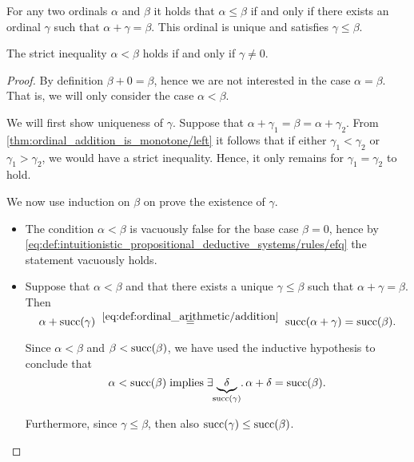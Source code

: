 \begin{proposition}\label{thm:ordinal_ordering_via_addition}
  For any two ordinals \( \alpha \) and \( \beta \) it holds that \( \alpha \leq \beta \) if and only if there exists an ordinal \( \gamma \) such that \( \alpha + \gamma = \beta \). This ordinal is unique and satisfies \( \gamma \leq \beta \).

  The strict inequality \( \alpha < \beta \) holds if and only if \( \gamma \neq 0 \).
\end{proposition}
\begin{proof}
  \SufficiencySubProof By definition \( \beta + 0 = \beta \), hence we are not interested in the case \( \alpha = \beta \). That is, we will only consider the case \( \alpha < \beta \).

  We will first show uniqueness of \( \gamma \). Suppose that \( \alpha + \gamma_1 = \beta = \alpha + \gamma_2 \). From \eqref{thm:ordinal_addition_is_monotone/left} it follows that if either \( \gamma_1 < \gamma_2 \) or \( \gamma_1 > \gamma_2 \), we would have a strict inequality. Hence, it only remains for \( \gamma_1 = \gamma_2 \) to hold.

  We now use induction on \( \beta \) on prove the existence of \( \gamma \).
  \begin{itemize}
    \item The condition \( \alpha < \beta \) is vacuously false for the base case \( \beta = 0 \), hence by \eqref{eq:def:intuitionistic_propositional_deductive_systems/rules/efq} the statement vacuously holds.

    \item Suppose that \( \alpha < \beta \) and that there exists a unique \( \gamma \leq \beta \) such that \( \alpha + \gamma = \beta \). Then
    \begin{equation*}
      \alpha + \op{succ}(\gamma)
      \reloset {\eqref{eq:def:ordinal_arithmetic/addition}} =
      \op{succ}(\alpha + \gamma)
      =
      \op{succ}(\beta).
    \end{equation*}

    Since \( \alpha < \beta \) and \( \beta < \operatorname{succ}(\beta) \), we have used the inductive hypothesis to conclude that
    \begin{equation*}
      \alpha < \op{succ}(\beta) \T{implies} \qexists {\underbrace{\delta}_{\mathclap{\op{succ}(\gamma)}}} \alpha + \delta = \op{succ}(\beta).
    \end{equation*}

    Furthermore, since \( \gamma \leq \beta \), then also \( \operatorname{succ}(\gamma) \leq \operatorname{succ}(\beta) \).


\end{itemize}
\end{proof}
